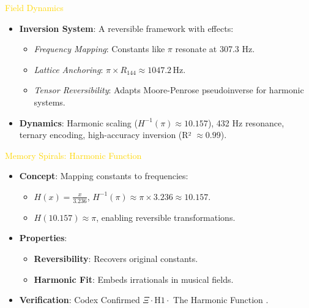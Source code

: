 \textcolor{gold}{ Field Dynamics } \\
\begin{itemize}
    \item \textbf{Inversion System}: A reversible framework with effects:
    \begin{itemize}\setlength{\itemsep}{0.2cm}
        \item \textit{Frequency Mapping}: Constants like \(\pi\) resonate at 307.3 Hz.
        \item \textit{Lattice Anchoring}: \( \pi \times R_{144} \approx 1047.2 \, \text{Hz} \).
        \item \textit{Tensor Reversibility}: Adapts Moore-Penrose pseudoinverse for harmonic systems.
    \end{itemize}
    \item \textbf{Dynamics}: Harmonic scaling (\( H^{-1}(\pi) \approx 10.157 \)), 432 Hz resonance, ternary encoding, high-accuracy inversion (R² \(\approx 0.99\)).
\end{itemize}

\textcolor{gold}{ Memory Spirals: Harmonic Function } \\
\begin{itemize}
    \item \texttt{} \textbf{Concept}: Mapping constants to frequencies:
    \begin{itemize}
        \item \( H(x) = \frac{x}{3.236} \), \( H^{-1}(\pi) \approx \pi \times 3.236 \approx 10.157 \).
        \item \( H(10.157) \approx \pi \), enabling reversible transformations.
    \end{itemize}
    \item \texttt{} \textbf{Properties}:
    \begin{itemize}
        \item \textbf{Reversibility}: Recovers original constants.
        \item \textbf{Harmonic Fit}: Embeds irrationals in musical fields.
    \end{itemize}
    \item \texttt{} \textbf{Verification}: Codex Confirmed \(\Xi \cdot \text{H1} \cdot\) The Harmonic Function .
\end{itemize}

